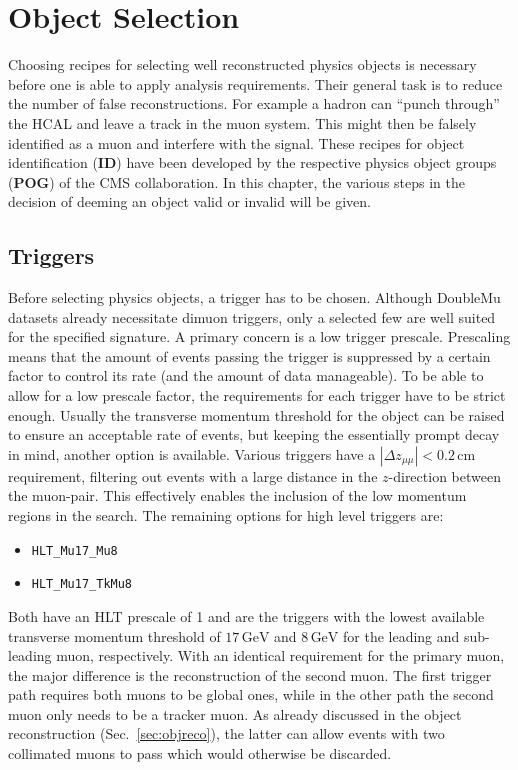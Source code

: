 \chapter{Object Selection}
\label{cha:objsel}

Choosing recipes for selecting well reconstructed physics objects is necessary before one is able to apply analysis requirements. Their general task is to reduce the number of false reconstructions. For example a hadron can ``punch through'' the HCAL and leave a track in the muon system. This might then be falsely identified as a muon and interfere with the signal. These recipes for object identification (\textbf{ID}) have been developed by the respective physics object groups (\textbf{POG}) of the CMS collaboration. In this chapter, the various steps in the decision of deeming an object valid or invalid will be given.

\section{Triggers}
\label{sec:trigger}

Before selecting physics objects, a trigger has to be chosen. Although DoubleMu datasets already necessitate dimuon triggers, only a selected few are well suited for the specified signature. A primary concern is a low trigger prescale. Prescaling means that the amount of events passing the trigger is suppressed by a certain factor to control its rate (and the amount of data manageable). To be able to allow for a low prescale factor, the requirements for each trigger have to be strict enough. Usually the transverse momentum threshold for the object can be raised to ensure an acceptable rate of events, but keeping the essentially prompt decay in mind, another option is available. Various triggers have a $|\Delta z_{\mu\mu}| < 0.2\,\text{cm}$ requirement, filtering out events with a large distance in the $z$-direction between the muon-pair. This effectively enables the inclusion of the low momentum regions in the search. The remaining options for high level triggers are:

\begin{itemize}
\item \verb+HLT_Mu17_Mu8+
\item \verb+HLT_Mu17_TkMu8+
\end{itemize}

Both have an HLT prescale of 1 and are the triggers with the lowest available transverse momentum threshold of $17\,\text{GeV}$ and $8\,\text{GeV}$ for the leading and sub-leading muon, respectively. With an identical requirement for the primary muon, the major difference is the reconstruction of the second muon. The first trigger path requires both muons to be global ones, while in the other path the second muon only needs to be a tracker muon. As already discussed in the object reconstruction (Sec.~\ref{sec:objreco}), the latter can allow events with two collimated muons to pass which would otherwise be discarded.


